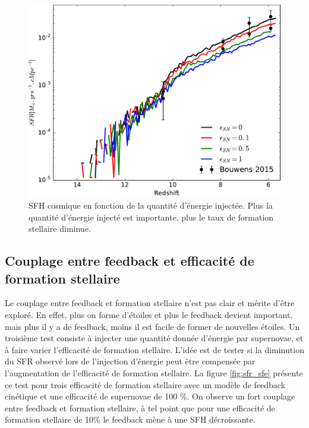 \begin{figure}
        \includegraphics[width=.95\textwidth]{img/03/sedov/sneff_SFR.pdf} 
        \caption[SFH cosmique en fonction de la quantité d'énergie injectée]{SFH cosmique en fonction de la quantité d'énergie injectée. 
        Plus la quantité d'énergie injecté est importante, plus le taux de formation stellaire diminue.
        }
 		\label{fig:sfr_egy}
\end{figure}

\subsection{Couplage entre feedback et efficacité de formation stellaire}
Le couplage entre feedback et formation stellaire n'est pas clair et mérite d'être exploré.
En effet, plus on forme d'étoiles et plus le feedback devient important, mais plus il y a de feedback, moins il est facile de former de nouvelles étoiles.
Un troisième test consiste à injecter une quantité donnée d'énergie par supernovae, et à faire varier l'efficacité de formation stellaire.
L'idée est de tester si la diminution du SFR observé lors de l'injection d'énergie peut être compensée par l'augmentation de l'efficacité de formation stellaire.
La figure \ref{fig:sfr_sfe} présente ce test pour trois efficacité de formation stellaire avec un modèle de feedback cinétique et une efficacité de supernovae de 100 \%.
On observe un fort couplage entre feedback et formation stellaire, à tel point que pour une efficacité de formation stellaire de 10\% le feedback mène à une SFH décroissante.

